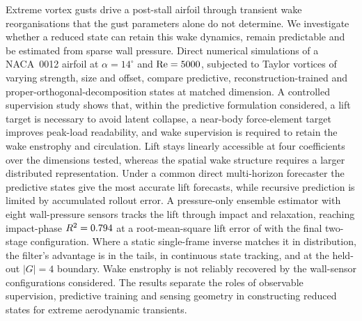 Extreme vortex gusts drive a post-stall airfoil through transient wake reorganisations that the gust parameters alone do not determine.
We investigate whether a reduced state can retain this wake dynamics, remain predictable and be estimated from sparse wall pressure.
Direct numerical simulations of a NACA~0012 airfoil at $\alpha = 14^\circ$ and $\mathrm{Re} = 5000$, subjected to Taylor vortices of varying strength, size and offset, compare predictive, reconstruction-trained and proper-orthogonal-decomposition states at matched dimension.
A controlled supervision study shows that, within the predictive formulation considered, a lift target is necessary to avoid latent collapse, a near-body force-element target improves peak-load readability, and wake supervision is required to retain the wake enstrophy and circulation.
Lift stays linearly accessible at four coefficients over the dimensions tested, whereas the spatial wake structure requires a larger distributed representation.
Under a common direct multi-horizon forecaster the predictive states give the most accurate lift forecasts, while recursive prediction is limited by accumulated rollout error.
A pressure-only ensemble estimator with eight wall-pressure sensors tracks the lift through impact and relaxation, reaching impact-phase $R^2 = 0.794$ at a root-mean-square lift error of \PoneTwoStageCovRmse{} with the final two-stage configuration.
Where a static single-frame inverse matches it in distribution, the filter's advantage is in the tails, in continuous state tracking, and at the held-out $|G| = 4$ boundary.
Wake enstrophy is not reliably recovered by the wall-sensor configurations considered.
The results separate the roles of observable supervision, predictive training and sensing geometry in constructing reduced states for extreme aerodynamic transients.\re
